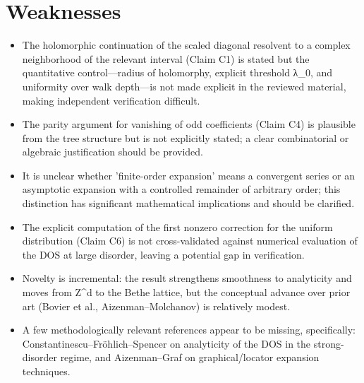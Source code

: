 \documentclass[11pt]{article}
\begin{document}
\section*{Weaknesses}
\begin{itemize}[leftmargin=*]
  \item The holomorphic continuation of the scaled diagonal resolvent to a complex neighborhood of the relevant interval (Claim C1) is stated but the quantitative control—radius of holomorphy, explicit threshold λ\_0, and uniformity over walk depth—is not made explicit in the reviewed material, making independent verification difficult.
  \item The parity argument for vanishing of odd coefficients (Claim C4) is plausible from the tree structure but is not explicitly stated; a clear combinatorial or algebraic justification should be provided.
  \item It is unclear whether 'finite-order expansion' means a convergent series or an asymptotic expansion with a controlled remainder of arbitrary order; this distinction has significant mathematical implications and should be clarified.
  \item The explicit computation of the first nonzero correction for the uniform distribution (Claim C6) is not cross-validated against numerical evaluation of the DOS at large disorder, leaving a potential gap in verification.
  \item Novelty is incremental: the result strengthens smoothness to analyticity and moves from Z\^{}d to the Bethe lattice, but the conceptual advance over prior art (Bovier et al., Aizenman–Molchanov) is relatively modest.
  \item A few methodologically relevant references appear to be missing, specifically: Constantinescu–Fröhlich–Spencer on analyticity of the DOS in the strong-disorder regime, and Aizenman–Graf on graphical/locator expansion techniques.
\end{itemize}
\end{document}
